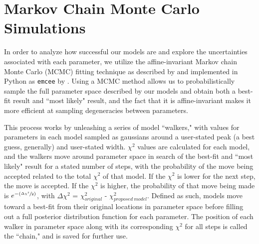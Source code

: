{{%

\section{Markov Chain Monte Carlo Simulations}
\label{MCMC}

In order to analyze how successful our models are and explore the uncertainties associated with each parameter, we utilize the affine-invariant Markov chain Monte Carlo (MCMC) fitting technique as described by \cite{Good10} and implemented in Python as \texttt{emcee} by \cite{Fore13}. Using a MCMC method allows us to probabilistically sample the full parameter space described by our models and obtain both a best-fit result and ``most likely" result, and the fact that it is affine-invariant makes it more efficient at sampling degeneracies between parameters. 

This process works by unleashing a series of model ``walkers," with values for parameters in each model sampled as gaussians around a user-stated peak (a best guess, generally) and user-stated width. $\chi^{2}$ values are calculated for each model, and the walkers move around parameter space in search of the best-fit and ``most likely" result for a stated number of steps, with the probability of the move being accepted related to the total $\chi^{2}$ of that model. If the $\chi^{2}$ is lower for the next step, the move is accepted. If the $\chi^{2}$ is higher, the probability of that move being made is $e^{-(\sfrac{\Delta \chi^{2}}{2})}$, with $\Delta \chi^{2}$ = $\chi^{2}_{original}$ - $\chi^{2}_{proposed~model}$. Defined as such, models move toward a best-fit from their original locations in parameter space before filling out a full posterior distribution function for each parameter. The position of each walker in parameter space along with its corresponding $\chi^{2}$ for all steps is called the ``chain," and is saved for further use. 

}}
